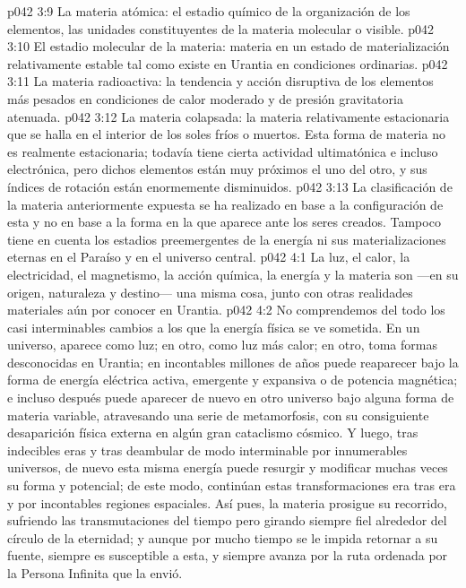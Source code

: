 \vs p042 3:9 La materia atómica: el estadio químico de la organización de los elementos, las unidades constituyentes de la materia molecular o visible.
\vs p042 3:10 El estadio molecular de la materia: materia en un estado de materialización relativamente estable tal como existe en Urantia en condiciones ordinarias.
\vs p042 3:11 La materia radioactiva: la tendencia y acción disruptiva de los elementos más pesados en condiciones de calor moderado y de presión gravitatoria atenuada.
\vs p042 3:12 La materia colapsada: la materia relativamente estacionaria que se halla en el interior de los soles fríos o muertos. Esta forma de materia no es realmente estacionaria; todavía tiene cierta actividad ultimatónica e incluso electrónica, pero dichos elementos están muy próximos el uno del otro, y sus índices de rotación están enormemente disminuidos.
\vs p042 3:13 \pc La clasificación de la materia anteriormente expuesta se ha realizado en base a la configuración de esta y no en base a la forma en la que aparece ante los seres creados. Tampoco tiene en cuenta los estadios preemergentes de la energía ni sus materializaciones eternas en el Paraíso y en el universo central.
\vs p042 4:1 La luz, el calor, la electricidad, el magnetismo, la acción química, la energía y la materia son ---en su origen, naturaleza y destino--- una misma cosa, junto con otras realidades materiales aún por conocer en Urantia.
\vs p042 4:2 No comprendemos del todo los casi interminables cambios a los que la energía física se ve sometida. En un universo, aparece como luz; en otro, como luz más calor; en otro, toma formas desconocidas en Urantia; en incontables millones de años puede reaparecer bajo la forma de energía eléctrica activa, emergente y expansiva o de potencia magnética; e incluso después puede aparecer de nuevo en otro universo bajo alguna forma de materia variable, atravesando una serie de metamorfosis, con su consiguiente desaparición física externa en algún gran cataclismo cósmico. Y luego, tras indecibles eras y tras deambular de modo interminable por innumerables universos, de nuevo esta misma energía puede resurgir y modificar muchas veces su forma y potencial; de este modo, continúan estas transformaciones era tras era y por incontables regiones espaciales. Así pues, la materia prosigue su recorrido, sufriendo las transmutaciones del tiempo pero girando siempre fiel alrededor del círculo de la eternidad; y aunque por mucho tiempo se le impida retornar a su fuente, siempre es susceptible a esta, y siempre avanza por la ruta ordenada por la Persona Infinita que la envió.
